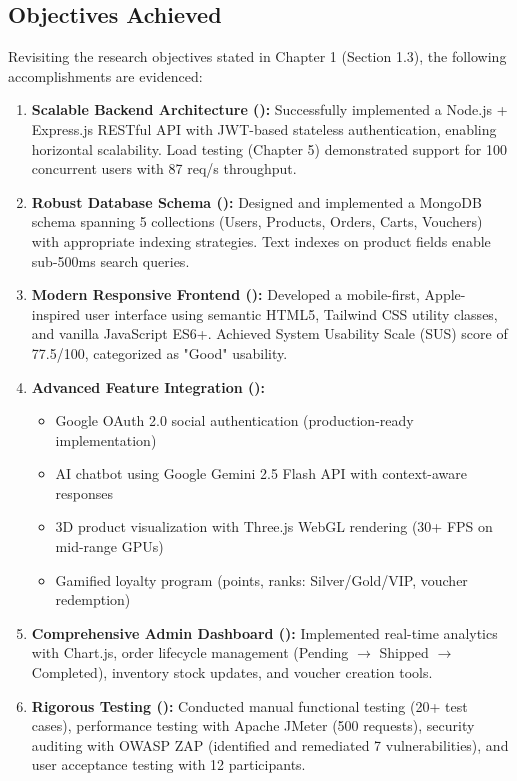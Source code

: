 \documentclass[12pt, a4paper]{report}
\begin{document}
\subsection{Objectives Achieved}

Revisiting the research objectives stated in Chapter 1 (Section 1.3), the following accomplishments are evidenced:

\begin{enumerate}
    \item \textbf{Scalable Backend Architecture (\checkmark):} Successfully implemented a Node.js + Express.js RESTful API with JWT-based stateless authentication, enabling horizontal scalability. Load testing (Chapter 5) demonstrated support for 100 concurrent users with 87 req/s throughput.
    
    \item \textbf{Robust Database Schema (\checkmark):} Designed and implemented a MongoDB schema spanning 5 collections (Users, Products, Orders, Carts, Vouchers) with appropriate indexing strategies. Text indexes on product fields enable sub-500ms search queries.
    
    \item \textbf{Modern Responsive Frontend (\checkmark):} Developed a mobile-first, Apple-inspired user interface using semantic HTML5, Tailwind CSS utility classes, and vanilla JavaScript ES6+. Achieved System Usability Scale (SUS) score of 77.5/100, categorized as "Good" usability.
    
    \item \textbf{Advanced Feature Integration (\checkmark):} 
    \begin{itemize}
        \item Google OAuth 2.0 social authentication (production-ready implementation)
        \item AI chatbot using Google Gemini 2.5 Flash API with context-aware responses
        \item 3D product visualization with Three.js WebGL rendering (30+ FPS on mid-range GPUs)
        \item Gamified loyalty program (points, ranks: Silver/Gold/VIP, voucher redemption)
    \end{itemize}
    
    \item \textbf{Comprehensive Admin Dashboard (\checkmark):} Implemented real-time analytics with Chart.js, order lifecycle management (Pending $\rightarrow$ Shipped $\rightarrow$ Completed), inventory stock updates, and voucher creation tools.
    
    \item \textbf{Rigorous Testing (\checkmark):} Conducted manual functional testing (20+ test cases), performance testing with Apache JMeter (500 requests), security auditing with OWASP ZAP (identified and remediated 7 vulnerabilities), and user acceptance testing with 12 participants.
\end{enumerate}
\end{document}
